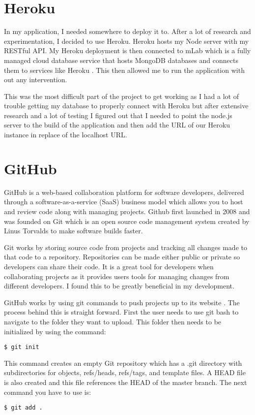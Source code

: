\section{Heroku}
In my application, I needed somewhere to deploy it to. After a lot of research and experimentation, I decided to use Heroku\cite{heroku}. Heroku hosts my Node server with my RESTful API. My Heroku deployment is then connected to mLab which is a fully managed cloud database service that hosts MongoDB databases and connects them to services like Heroku \cite{mlab}. This then allowed me to run the application with out any intervention. 

This was the most difficult part of the project to get working as I had a lot of trouble getting my database to properly connect with Heroku but after extensive research and a lot of testing I figured out that I needed to point the node.js server to the build of the application and then add the URL of our Heroku instance in replace of the localhost URL.



\section{GitHub}
GitHub is a web-based collaboration platform for software developers, delivered through a software-as-a-service (SaaS) business model which allows you to host and review code along with managing projects. Github first launched in 2008 and was founded on Git which is an open source code management system created by Linus Torvalds to make software builds faster.\cite{github}

Git works by storing source code from projects and tracking all changes made to that code to a repository. Repositories can be made either public or private so developers can share their code. It is a great tool for developers when collaborating projects as it provides users tools for managing changes from different developers. I found this to be greatly beneficial in my development.

GitHub works by using git commands to push projects up to its website \cite{gitcommands}. The process behind this is straight forward. First the user needs to use git bash to navigate to the folder they want to upload. This folder then needs to be initialized by using the command:
\begin{verbatim}
$ git init
\end{verbatim}
This command creates an empty Git repository which has a .git directory with subdirectories for objects, refs/heads, refs/tags, and template files. A HEAD file is also created and this file references the HEAD of the master branch.
The next command you have to use is:
\begin{verbatim}
$ git add .
\end{verbatim}

